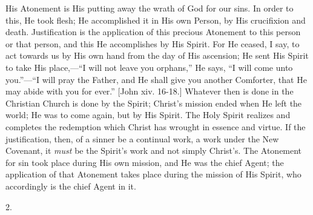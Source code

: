 His Atonement is His putting away the wrath of God for our sins. In
order to this, He took flesh; He accomplished it in His own Person, by
His crucifixion and death. Justification is the application of this
precious Atonement to this person or that person, and this He
accomplishes by His Spirit. For He ceased, I say, to act towards us by
His own hand from the day of His ascension; He sent His Spirit to take
His place,—``I will not leave you orphans,'' He says,
``I will come unto you.''—``I will pray the Father, and
He shall give you another Comforter, that He may abide with you for
ever.'' [John xiv. 16-18.] Whatever then is done in the Christian
Church is done by the Spirit; Christ's mission ended when He left the
world; He was to come again, but by His Spirit. The Holy Spirit
realizes and completes the redemption which Christ has wrought in
essence and virtue. If the justification, then, of a sinner be a
continual work, a work under the New Covenant, it \emph{must} be the
Spirit's work and not simply Christ's. The Atonement for sin took
place during His own mission, and He was the chief Agent; the
application of that Atonement takes place during the mission of His
Spirit, who accordingly is the chief Agent in it.

2.


